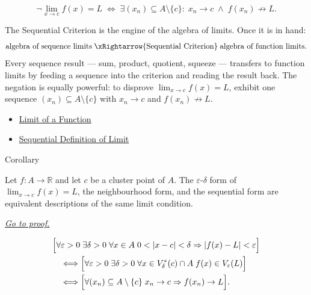 \begin{remark*}
\[
  \neg\lim_{x\to c}f(x)=L
  \;\iff\;
  \exists (x_n) \subseteq A \setminus \{c\} :\;
  x_n \to c \;\wedge\; f(x_n) \not\to L.
\]
\end{remark*}

\begin{remark*}[Interpretation]
The Sequential Criterion is the engine of the algebra of limits.
Once it is in hand:
\[
  \text{algebra of sequence limits}
  \;\xRightarrow{\text{Sequential Criterion}}\;
  \text{algebra of function limits.}
\]
Every sequence result — sum, product, quotient, squeeze — transfers
to function limits by feeding a sequence into the criterion and
reading the result back. The negation is equally powerful: to
disprove $\lim_{x\to c}f(x)=L$, exhibit one sequence
$(x_n) \subseteq A \setminus \{c\}$ with $x_n \to c$ and
$f(x_n) \not\to L$.
\end{remark*}

\begin{dependencies}
\begin{itemize}
  \item \hyperref[def:limit-function]{Limit of a Function}
  \item \hyperref[def:limit-function-sequential]{Sequential Definition of Limit}
\end{itemize}
\end{dependencies}


\begin{corollarybox}{Corollary}
\begin{corollary}
\label{cor:limit-three-equiv}
Let $f : A \to \mathbb{R}$ and let $c$ be a cluster point of $A$.
The $\varepsilon$-$\delta$ form of $\lim_{x\to c}f(x)=L$, the
neighbourhood form, and the sequential form are equivalent descriptions
of the same limit condition.

\smallskip\noindent
\hyperref[prf:limit-three-equiv]{\textit{Go to proof.}}
\end{corollary}
\end{corollarybox}

\begin{remark*}
\[
\begin{aligned}
&\Bigl[\forall\varepsilon>0\;\exists\delta>0\;\forall x\in A\;
  0<|x-c|<\delta\Rightarrow |f(x)-L|<\varepsilon\Bigr] \\
&\quad\Longleftrightarrow
\Bigl[\forall\varepsilon>0\;\exists\delta>0\;\forall x\in V_\delta^*(c)\cap A\;
  f(x)\in V_\varepsilon(L)\Bigr] \\
&\quad\Longleftrightarrow
\Bigl[\forall (x_n)\subseteq A\setminus\{c\}\;
  x_n\to c\Rightarrow f(x_n)\to L\Bigr].
\end{aligned}
\]
\end{remark*}

